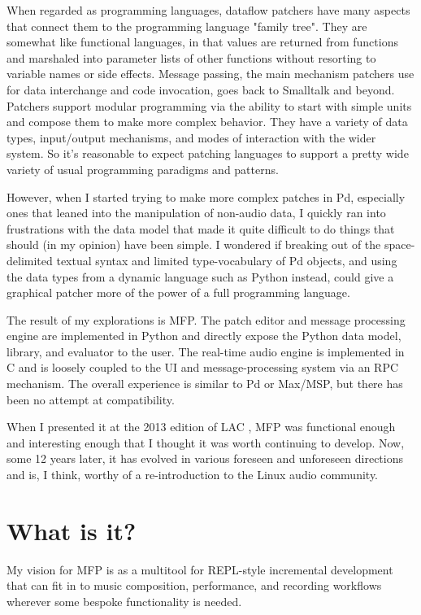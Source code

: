 \documentclass[a4paper]{article}
\begin{document}
When regarded as programming languages, dataflow patchers have
many aspects that connect them to the programming language
"family tree".  They are somewhat like functional languages,
in that values are returned from functions and marshaled into
parameter lists of other functions without resorting to variable
names or side effects.  Message passing, the main mechanism
patchers use for data interchange and code invocation, goes back
to Smalltalk and beyond. Patchers support modular programming
via the ability to start with simple units and compose them to
make more complex behavior. They have a variety of data types,
input/output mechanisms, and modes of interaction with the wider
system. So it's reasonable to expect patching languages to
support a pretty wide variety of usual programming paradigms and
patterns.

However, when I started trying to make more complex patches in
Pd, especially ones that leaned into the manipulation of
non-audio data, I quickly ran into frustrations with the data
model that made it quite difficult to do things that should (in
my opinion) have been simple. I wondered if breaking out of the
space-delimited textual syntax and limited type-vocabulary of Pd
objects, and using the data types from a dynamic language such as
Python instead, could give a graphical patcher more of the power
of a full programming language.

The result of my explorations is MFP. The patch editor and
message processing engine are implemented in Python and directly
expose the Python data model, library, and evaluator to the user.
The real-time audio engine is implemented in C and is loosely
coupled to the UI and message-processing system via an RPC
mechanism. The overall experience is similar to Pd or Max/MSP,
but there has been no attempt at compatibility.

When I presented it at the 2013 edition of LAC
\cite{Gribble:2013}, MFP was functional enough and interesting
enough that I thought it was worth continuing to develop. Now,
some 12 years later, it has evolved in various foreseen and
unforeseen directions and is, I think, worthy of a
re-introduction to the Linux audio community.


\section{What is it?}

My vision for MFP is as a multitool for REPL-style incremental
development that can fit in to music composition, performance,
and recording workflows wherever some bespoke functionality is
needed.
\end{document}
